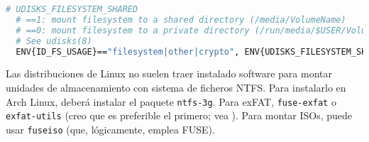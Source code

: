\begin{lstlisting}[gobble=2,language=bash,style=bashcode]
  # UDISKS_FILESYSTEM_SHARED
  # ==1: mount filesystem to a shared directory (/media/VolumeName)
  # ==0: mount filesystem to a private directory (/run/media/$USER/VolumeName)
  # See udisks(8)
  ENV{ID_FS_USAGE}=="filesystem|other|crypto", ENV{UDISKS_FILESYSTEM_SHARED}="1"
\end{lstlisting}

Las distribuciones de Linux no suelen traer instalado software para montar unidades de almacenamiento con
sistema de ficheros NTFS. Para instalarlo en Arch Linux, deberá instalar el paquete \lstinline!ntfs-3g!. Para
exFAT, \lstinline!fuse-exfat! o \lstinline!exfat-utils! (creo que es preferible el primero; vea
). Para montar ISOs, puede usar \lstinline!fuseiso! (que, lógicamente, emplea FUSE).
